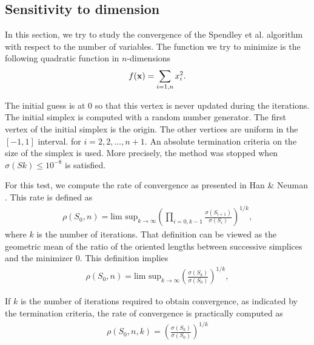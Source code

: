 \subsection{Sensitivity to dimension}

In this section, we try to study the convergence of the 
Spendley et al. algorithm with respect to the number of variables.
The function we try to minimize is the following quadratic function 
in $n$-dimensions 
\begin{eqnarray}
\label{quadratic-sp-function3}
f(\mathbf{x}) = \sum_{i=1,n} x_i^2.
\end{eqnarray}

The initial guess is at 0 so that this vertex is never updated 
during the iterations.
The initial simplex is computed with a random number generator.
The first vertex of the initial simplex is the origin.
The other vertices are uniform in the $[-1,1]$ interval.
for $i = 2, 2, \ldots , n+1$.
An absolute termination criteria on the size of the simplex is used.
More precisely, the method was stopped when $\sigma(Sk) \leq 10^{-8}$ is satisfied.

For this test, we compute the rate of convergence as presented
in Han \& Neuman \cite{HanNeumann2006}. This rate is defined as 
\begin{eqnarray}
\label{rho-sp-rate-convergence}
\rho(S_0,n) = \textrm{lim sup}_{k\rightarrow \infty} 
\left(\prod_{i=0,k-1} \frac{\sigma(S_{i+1})}{\sigma(S_i)}\right)^{1/k},
\end{eqnarray}
where $k$ is the number of iterations.
That definition can be viewed as the geometric mean of the ratio of the 
oriented lengths between successive simplices and the minimizer 0.
This definition implies 
\begin{eqnarray}
\label{rho-sp-rate-convergence2}
\rho(S_0,n) = \textrm{lim sup}_{k\rightarrow \infty} 
\left(\frac{\sigma(S_k)}{\sigma(S_0)}\right)^{1/k},
\end{eqnarray}

If $k$ is the number of iterations required to obtain convergence, as 
indicated by the termination criteria, the rate of convergence is practically computed as 
\begin{eqnarray}
\rho(S_0,n,k) = \left( \frac{\sigma(S_{k})}{\sigma(S_0)}\right)^{1/k}
\end{eqnarray}


